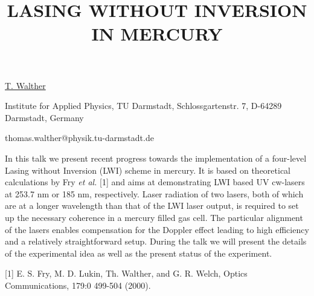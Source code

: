 \title{LASING WITHOUT INVERSION IN MERCURY}

\underline{T. Walther} 

{\normalsize{\vspace{-4mm}
Institute for Applied Physics, TU Darmstadt, Schlossgartenstr. 7, D-64289 Darmstadt, Germany

\email thomas.walther@physik.tu-darmstadt.de}}

In this talk we present recent progress towards the implementation of a four-level Lasing without Inversion (LWI) scheme in mercury.
It is based on theoretical calculations by Fry \textit{et al.} [1] and aims at demonstrating LWI based UV cw-lasers at 253.7
nm or 185 nm, respectively. Laser radiation of two lasers, both of which are at a longer wavelength than that of the LWI laser output,
is required to set up the necessary coherence in a mercury filled gas cell. The particular alignment of the lasers enables
compensation for the Doppler effect leading to high efficiency and a relatively straightforward setup. During the talk we will present
the details of the experimental idea as well as the present status of the experiment.

{\normalsize
[1] E. S. Fry, M. D. Lukin, Th. Walther, and G. R. Welch, Optics Communications, 179:0 499-504 (2000).
}

\vspace{\baselineskip}
